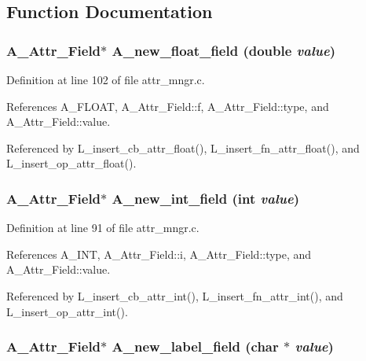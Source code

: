 \subsection{Function Documentation}
\subsubsection{\setlength{\rightskip}{0pt plus 5cm}\bf{A\_\-Attr\_\-Field}$\ast$ A\_\-new\_\-float\_\-field (double {\em value})}\label{attr__mngr_8c_5d43789689f71a440141d23beaa61774}




Definition at line 102 of file attr\_\-mngr.c.

References A\_\-FLOAT, A\_\-Attr\_\-Field::f, A\_\-Attr\_\-Field::type, and A\_\-Attr\_\-Field::value.

Referenced by L\_\-insert\_\-cb\_\-attr\_\-float(), L\_\-insert\_\-fn\_\-attr\_\-float(), and L\_\-insert\_\-op\_\-attr\_\-float().
\subsubsection{\setlength{\rightskip}{0pt plus 5cm}\bf{A\_\-Attr\_\-Field}$\ast$ A\_\-new\_\-int\_\-field (int {\em value})}\label{attr__mngr_8c_66f51f46e789b5fd9841161b7db057ee}




Definition at line 91 of file attr\_\-mngr.c.

References A\_\-INT, A\_\-Attr\_\-Field::i, A\_\-Attr\_\-Field::type, and A\_\-Attr\_\-Field::value.

Referenced by L\_\-insert\_\-cb\_\-attr\_\-int(), L\_\-insert\_\-fn\_\-attr\_\-int(), and L\_\-insert\_\-op\_\-attr\_\-int().
\subsubsection{\setlength{\rightskip}{0pt plus 5cm}\bf{A\_\-Attr\_\-Field}$\ast$ A\_\-new\_\-label\_\-field (char $\ast$ {\em value})}\label{attr__mngr_8c_0acd270597040731fe079b3d0cb7dd65}




